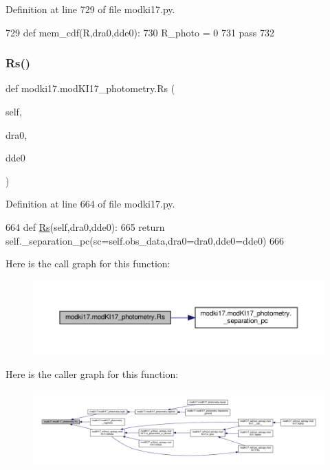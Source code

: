 Definition at line 729 of file modki17.\+py.


\begin{DoxyCode}
729     \textcolor{keyword}{def }mem\_cdf(R,dra0,dde0):
730         R\_photo = 0
731         \textcolor{keywordflow}{pass}
732     
\end{DoxyCode}
\mbox{\label{classmodki17_1_1modKI17__photometry_aebe66d2f7557c9143c8d636468400837}} 
\subsubsection{\texorpdfstring{Rs()}{Rs()}}
{\footnotesize\ttfamily def modki17.\+mod\+K\+I17\+\_\+photometry.\+Rs (\begin{DoxyParamCaption}\item[{}]{self,  }\item[{}]{dra0,  }\item[{}]{dde0 }\end{DoxyParamCaption})}



Definition at line 664 of file modki17.\+py.


\begin{DoxyCode}
664     \textcolor{keyword}{def }\hyperlink{namespacedsph__model_af25a421d0de32d247b1aa0e8cf4894e3}{Rs}(self,dra0,dde0):
665         \textcolor{keywordflow}{return} self.\_separation\_pc(sc=self.obs\_data,dra0=dra0,dde0=dde0)
666     
\end{DoxyCode}
Here is the call graph for this function\+:\nopagebreak
\begin{figure}[H]
\begin{center}
\leavevmode
\includegraphics[width=350pt]{dd/db2/classmodki17_1_1modKI17__photometry_aebe66d2f7557c9143c8d636468400837_cgraph}
\end{center}
\end{figure}
Here is the caller graph for this function\+:\nopagebreak
\begin{figure}[H]
\begin{center}
\leavevmode
\includegraphics[width=350pt]{dd/db2/classmodki17_1_1modKI17__photometry_aebe66d2f7557c9143c8d636468400837_icgraph}
\end{center}
\end{figure}


